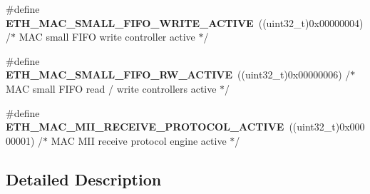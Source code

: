 \begin{DoxyCompactItemize}
\item 
\hypertarget{group___h_a_l___e_t_h___aliased___defines_ga54622c82079395c06def322572f42d90}{\#define {\bfseries E\-T\-H\-\_\-\-M\-A\-C\-\_\-\-S\-M\-A\-L\-L\-\_\-\-F\-I\-F\-O\-\_\-\-W\-R\-I\-T\-E\-\_\-\-A\-C\-T\-I\-V\-E}~((uint32\-\_\-t)0x00000004)  /$\ast$ M\-A\-C small F\-I\-F\-O write controller active $\ast$/}\label{group___h_a_l___e_t_h___aliased___defines_ga54622c82079395c06def322572f42d90}

\item 
\hypertarget{group___h_a_l___e_t_h___aliased___defines_gaef20d59c181d5c3c828ea428e7c0d81e}{\#define {\bfseries E\-T\-H\-\_\-\-M\-A\-C\-\_\-\-S\-M\-A\-L\-L\-\_\-\-F\-I\-F\-O\-\_\-\-R\-W\-\_\-\-A\-C\-T\-I\-V\-E}~((uint32\-\_\-t)0x00000006)  /$\ast$ M\-A\-C small F\-I\-F\-O read / write controllers active $\ast$/}\label{group___h_a_l___e_t_h___aliased___defines_gaef20d59c181d5c3c828ea428e7c0d81e}

\item 
\hypertarget{group___h_a_l___e_t_h___aliased___defines_ga69bdbf3c1abe74dde1f5e1d2a85a501e}{\#define {\bfseries E\-T\-H\-\_\-\-M\-A\-C\-\_\-\-M\-I\-I\-\_\-\-R\-E\-C\-E\-I\-V\-E\-\_\-\-P\-R\-O\-T\-O\-C\-O\-L\-\_\-\-A\-C\-T\-I\-V\-E}~((uint32\-\_\-t)0x00000001)  /$\ast$ M\-A\-C M\-I\-I receive protocol engine active $\ast$/}\label{group___h_a_l___e_t_h___aliased___defines_ga69bdbf3c1abe74dde1f5e1d2a85a501e}

\end{DoxyCompactItemize}


\subsection{Detailed Description}
